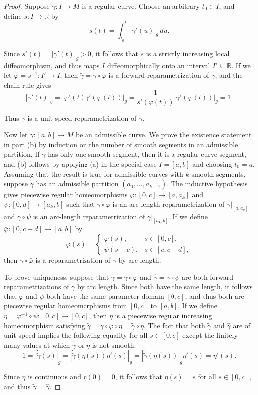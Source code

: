 \begin{proof}
Suppose $\gamma : I \to M$ is a regular curve. Choose an arbitrary $t_0 \in I$, and define $s : I \to \mathbb{R}$ by
\[s(t) = \int_{t_0}^t |\gamma'(u)|_g \, du.\]

Since $s'(t) = |\gamma'(t)|_g > 0$, it follows that $s$ is a strictly increasing local diffeomorphism, and thus maps $I$ diffeomorphically onto an interval $I' \subseteq \mathbb{R}$. If we let $\varphi = s^{-1} : I' \to I$, then $\tilde{\gamma} = \gamma \circ \varphi$ is a forward reparametrization of $\gamma$, and the chain rule gives
\[|\tilde{\gamma}'(t)|_g = |\varphi'(t)\gamma'(\varphi(t))|_g = \frac{1}{s'(\varphi(t))}|\gamma'(\varphi(t))|_g = 1.\]

Thus $\tilde{\gamma}$ is a unit-speed reparametrization of $\gamma$.

Now let $\gamma : [a, b] \to M$ be an admissible curve. We prove the existence statement in part (b) by induction on the number of smooth segments in an admissible partition. If $\gamma$ has only one smooth segment, then it is a regular curve segment, and (b) follows by applying (a) in the special case $I = [a, b]$ and choosing $t_0 = a$. Assuming that the result is true for admissible curves with $k$ smooth segments, suppose $\gamma$
has an admissible partition $(a_0, \ldots, a_{k+1})$. The inductive hypothesis gives piecewise regular homeomorphisms $\varphi : [0,c] \to [a, a_k]$ and $\psi : [0,d] \to [a_k, b]$ such that $\gamma \circ \varphi$ is an arc-length reparametrization of $\gamma|_{[a,a_k]}$ and $\gamma \circ \psi$ is an arc-length reparametrization of $\gamma|_{[a_k,b]}$. If we define $\bar{\varphi}: [0, c+d] \to [a,b]$ by
\[
\bar{\varphi}(s) = \begin{cases}
\varphi(s), & s \in [0,c], \\
\psi(s-c), & s \in [c, c+d],
\end{cases}
\]
then $\gamma \circ \bar{\varphi}$ is a reparametrization of $\gamma$ by arc length.

To prove uniqueness, suppose that $\tilde{\gamma} = \gamma \circ \varphi$ and $\hat{\gamma} = \gamma \circ \psi$ are both forward reparametrizations of $\gamma$ by arc length. Since both have the same length, it follows that $\varphi$ and $\psi$ both have the same parameter domain $[0,c]$, and thus both are piecewise regular homeomorphisms from $[0,c]$ to $[a,b]$. If we define $\eta = \varphi^{-1} \circ \psi: [0,c] \to [0,c]$, then $\eta$ is a piecewise regular increasing homeomorphism satisfying $\tilde{\gamma} = \gamma \circ \varphi \circ \eta = \tilde{\gamma} \circ \eta$. The fact that both $\tilde{\gamma}$ and $\hat{\gamma}$ are of unit speed implies the following equality for all $s \in [0,c]$ except the finitely many values at which $\tilde{\gamma}$ or $\eta$ is not smooth:
\[
1 = |\dot{\tilde{\gamma}}(s)|_g = |\dot{\tilde{\gamma}}(\eta(s))\eta'(s)|_g = |\dot{\tilde{\gamma}}(\eta(s))|_g \eta'(s) = \eta'(s).
\]

Since $\eta$ is continuous and $\eta(0) = 0$, it follows that $\eta(s) = s$ for all $s \in [0,c]$, and thus $\tilde{\gamma} = \hat{\gamma}$.
\end{proof}

